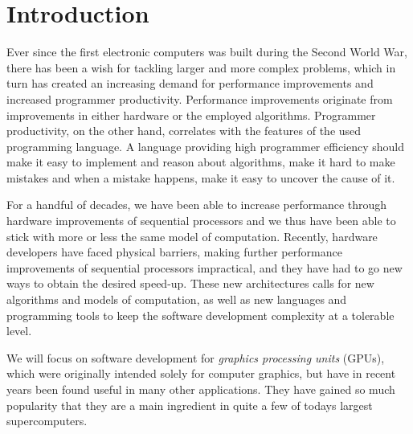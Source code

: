 
\chapter{Introduction}
Ever since the first electronic computers was built during the Second
World War, there has been a wish for tackling larger and more complex
problems, which in turn has created an increasing demand for
performance improvements and increased programmer
productivity. Performance improvements originate from improvements in
either hardware or the employed algorithms. Programmer productivity,
on the other hand, correlates with the features of the used
programming language. A language providing high programmer efficiency
should make it easy to implement and reason about algorithms, make it
hard to make mistakes and when a mistake happens, make it easy to
uncover the cause of it. 

For a handful of decades, we have been able to increase performance
through hardware improvements of sequential processors and we thus
have been able to stick with more or less the same model of
computation. Recently, hardware developers have faced physical
barriers, making further performance improvements of sequential
processors impractical, and they have had to go new ways to obtain the
desired speed-up. These new architectures calls for new algorithms and
models of computation, as well as new languages and programming tools
to keep the software development complexity at a tolerable level.

We will focus on software development for \textit{graphics processing
  units} (GPUs), which were originally intended solely for computer
graphics, but have in recent years been found useful in many other
applications. They have gained so much popularity that they are a main
ingredient in quite a few of todays largest
supercomputers. 

